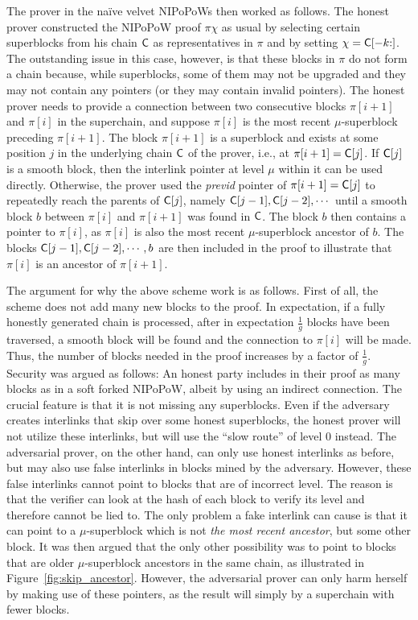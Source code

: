 The prover in the na\"ive velvet NIPoPoWs then worked as follows. The honest
prover constructed the NIPoPoW proof $\pi \chi$ as usual by selecting certain
superblocks from his chain $\mathsf{C}$ as representatives in $\pi$ and by setting
$\chi = \mathsf{C}[-k{:}]$. The outstanding issue in this case, however, is that
these blocks in $\pi$ do not form a chain because, while superblocks, some of
them may not be upgraded and they may not contain any pointers (or they may
contain invalid pointers). The honest prover needs to provide a connection
between two consecutive blocks $\pi[i + 1]$ and $\pi[i]$ in the superchain, and
suppose $\pi[i]$ is the most recent $\mu$-superblock preceding $\pi[i + 1]$. The
block $\pi[i + 1]$ is a superblock and exists at some position $j$ in the
underlying chain $\mathsf{C}$ of the prover, i.e., at $\pi[i + 1] = \mathsf{C}[j]$. If
$\mathsf{C}[j]$ is a smooth block, then the interlink pointer at level $\mu$ within
it can be used directly. Otherwise, the prover used the \emph{previd} pointer of
$\pi[i + 1] = \mathsf{C}[j]$ to repeatedly reach the parents of $\mathsf{C}[j]$, namely
$\mathsf{C}[j - 1], \mathsf{C}[j - 2], \cdots$ until a smooth block $b$ between $\pi[i]$
and $\pi[i + 1]$ was found in $\mathsf{C}$. The block $b$ then contains a pointer to
$\pi[i]$, as $\pi[i]$ is also the most recent $\mu$-superblock ancestor of $b$.
The blocks $\mathsf{C}[j - 1], \mathsf{C}[j - 2], \cdots, b$ are then included in the
proof to illustrate that $\pi[i]$ is an ancestor of $\pi[i + 1]$.

The argument for why the above scheme work is as follows. First of all, the
scheme does not add many new blocks to the proof. In expectation, if a fully
honestly generated chain is processed, after in expectation $\frac{1}{g}$ blocks
have been traversed, a smooth block will be found and the connection to $\pi[i]$
will be made. Thus, the number of blocks needed in the proof increases by a
factor of $\frac{1}{g}$. Security was argued as follows: An honest party
includes in their proof as many blocks as in a soft forked NIPoPoW, albeit by
using an indirect connection. The crucial feature is that it is not missing any
superblocks. Even if the adversary creates interlinks that skip over some honest
superblocks, the honest prover will not utilize these interlinks, but will use
the ``slow route'' of level $0$ instead. The adversarial prover, on the other
hand, can only use honest interlinks as before, but may also use false
interlinks in blocks mined by the adversary. However, these false
interlinks cannot point to blocks that are of incorrect level. The reason is
that the verifier can look at the hash of each block to verify its level and
therefore cannot be lied to. The only problem a fake interlink can cause is that
it can point to a $\mu$-superblock which is not \emph{the most recent ancestor},
but some other block. It was then argued that the only other possibility was
to point to blocks that are older $\mu$-superblock ancestors in the same chain,
as illustrated in Figure~\ref{fig:skip_ancestor}. However, the adversarial
prover can only harm herself by making use of these pointers, as the result will
simply by a superchain with fewer blocks.

